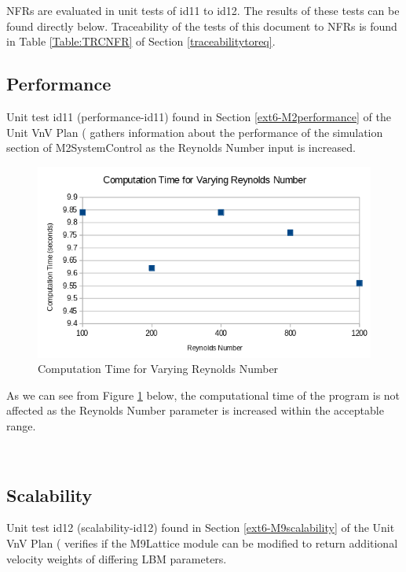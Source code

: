 \documentclass[12pt, titlepage]{article}
\begin{document}
NFRs are evaluated in unit tests of id11 to id12. The results of these tests can be found directly below. Traceability of the tests of this document to NFRs is found in Table \ref{Table:TRCNFR} of Section \ref{traceabilitytoreq}.
		
\subsection{Performance}

Unit test id11 (performance-id11) found in Section \ref{ext6-M2performance} of the Unit VnV Plan (\citet{LBM_UVNV_PM} gathers information about the performance of the simulation section of M2SystemControl as the Reynolds Number input is increased.\\ 


\begin{figure}[h!]
	\begin{center}
		\includegraphics[width=1.0\textwidth]{compreynolds}
		\caption{Computation Time for Varying Reynolds Number}
		\label{Fig_ComputationTimeReynolds}
	\end{center}
\end{figure}

\noindent As we can see from Figure \ref{Fig_ComputationTimeReynolds} below, the computational time of the program is not affected as the Reynolds Number parameter is increased within the acceptable range.

~\newpage
\subsection{Scalability}
\label{nfrscalability}

Unit test id12 (scalability-id12) found in Section \ref{ext6-M9scalability} of the Unit VnV Plan (\citet{LBM_UVNV_PM} verifies if the M9Lattice module can be modified to return additional velocity weights of differing LBM parameters.\\
\end{document}
